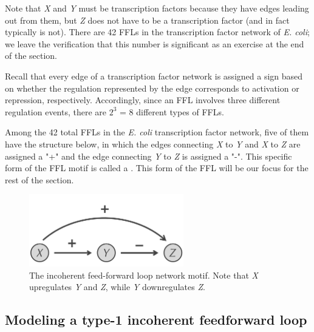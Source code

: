 Note that \textit{X} and \textit{Y} must be transcription factors because they have edges leading out from them, but \textit{Z} does not have to be a transcription factor (and in fact typically is not). There are 42 FFLs in the transcription factor network of \textit{E. coli}; we leave the verification that this number is significant as an exercise at the end of the section.

Recall that every edge of a transcription factor network is assigned a sign based on whether the regulation represented by the edge corresponds to activation or repression, respectively. Accordingly, since an FFL involves three different regulation events, there are $2^3$ = 8 different types of FFLs.

Among the 42 total FFLs in the \textit{E. coli} transcription factor network, five of them have the structure below, in which the edges connecting \textit{X} to \textit{Y} and \textit{X} to \textit{Z} are assigned a "+" and the edge connecting \textit{Y} to \textit{Z} is assigned a "-". This specific form of the FFL motif is  called a . This form of the FFL will be our focus for the rest of the section.

\begin{qbox}\end{qbox} 

\begin{figure}[h]
\centering
\mySfFamily
\includegraphics[width = 0.6\textwidth]{../images/type-1_incoherent_feed-forward_loop.png}
\caption{The incoherent feed-forward loop network motif. Note that \textit{X} upregulates \textit{Y} and \textit{Z}, while \textit{Y} downregulates \textit{Z}.}
\label{fig:type-1_incoherent_feed-forward_loop}
\end{figure}

\FloatBarrier
{}
\subsection{Modeling a type-1 incoherent feedforward loop}

